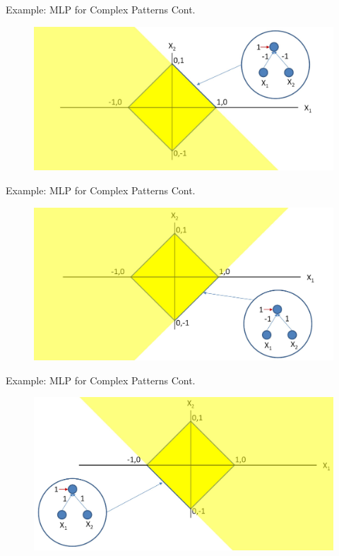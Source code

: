 \documentclass[serif, aspectratio=169]{beamer}
\begin{document}
\begin{frame}{Example: MLP for Complex Patterns Cont.}
	\begin{figure}[htpb]
		\begin{center}
			\includegraphics[keepaspectratio, scale=0.25]{pic/2/ex3.png}
		\end{center}
	\end{figure}
\end{frame}


\begin{frame}{Example: MLP for Complex Patterns Cont.}
	\begin{figure}[htpb]
		\begin{center}
			\includegraphics[keepaspectratio, scale=0.25]{pic/2/ex4.png}
		\end{center}
	\end{figure}
\end{frame}


\begin{frame}{Example: MLP for Complex Patterns Cont.}
	\begin{figure}[htpb]
		\begin{center}
			\includegraphics[keepaspectratio, scale=0.25]{pic/2/ex5.png}
		\end{center}
	\end{figure}
\end{frame}
\end{document}
